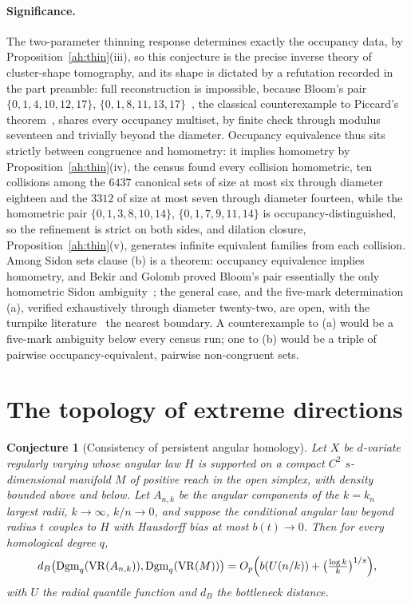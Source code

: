 \documentclass[11pt]{article}
\newtheorem{conjecture}{Conjecture}
\theoremstyle{definition}
\begin{document}
\paragraph{Significance.}
The two-parameter thinning response determines exactly the occupancy data, by Proposition~\ref{ah:thin}(iii), so this conjecture is the precise inverse theory of cluster-shape tomography, and its shape is dictated by a refutation recorded in the part preamble: full reconstruction is impossible, because Bloom's pair $\{0,1,4,10,12,17\}$, $\{0,1,8,11,13,17\}$~\cite{Blo77}, the classical counterexample to Piccard's theorem~\cite{Pat44}, shares every occupancy multiset, by finite check through modulus seventeen and trivially beyond the diameter.  Occupancy equivalence thus sits strictly between congruence and homometry: it implies homometry by Proposition~\ref{ah:thin}(iv), the census found every collision homometric, ten collisions among the $6437$ canonical sets of size at most six through diameter eighteen and the $3312$ of size at most seven through diameter fourteen, while the homometric pair $\{0,1,3,8,10,14\}$, $\{0,1,7,9,11,14\}$ is occupancy-distinguished, so the refinement is strict on both sides, and dilation closure, Proposition~\ref{ah:thin}(v), generates infinite equivalent families from each collision.  Among Sidon sets clause (b) is a theorem: occupancy equivalence implies homometry, and Bekir and Golomb proved Bloom's pair essentially the only homometric Sidon ambiguity~\cite{BG07}; the general case, and the five-mark determination (a), verified exhaustively through diameter twenty-two, are open, with the turnpike literature~\cite{LSS03} the nearest boundary.  A counterexample to (a) would be a five-mark ambiguity below every census run; one to (b) would be a triple of pairwise occupancy-equivalent, pairwise non-congruent sets.

\section{The topology of extreme directions}

\begin{conjecture}[Consistency of persistent angular homology]\label{ah7}
Let $X$ be $d$-variate regularly varying whose angular law $H$ is supported on a compact $C^2$ $s$-dimensional manifold $M$ of positive reach in the open simplex, with density bounded above and below.  Let $A_{n,k}$ be the angular components of the $k=k_n$ largest radii, $k\to\infty$, $k/n\to0$, and suppose the conditional angular law beyond radius $t$ couples to $H$ with Hausdorff bias at most $b(t)\to0$.  Then for every homological degree $q$,
\[
d_B\bigl(\operatorname{Dgm}_q(\operatorname{VR}(A_{n,k})),\operatorname{Dgm}_q(\operatorname{VR}(M))\bigr)
=O_p\Bigl(b(U(n/k))+\bigl(\tfrac{\log k}k\bigr)^{1/s}\Bigr),
\]
with $U$ the radial quantile function and $d_B$ the bottleneck distance.
\end{conjecture}
\end{document}
